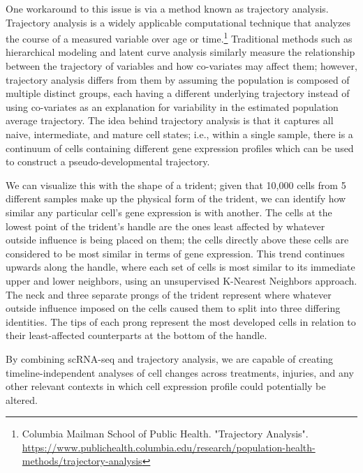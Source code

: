 \documentclass{article}
\begin{document}
One workaround to this issue is via a method known as trajectory analysis. Trajectory analysis is a widely applicable computational technique that analyzes the course of a measured variable over age or time.\footnote{Columbia Mailman School of Public Health. "Trajectory Analysis". \url{https://www.publichealth.columbia.edu/research/population-health-methods/trajectory-analysis}} Traditional methods such as hierarchical modeling and latent curve analysis similarly measure the relationship between the trajectory of variables and how co-variates may affect them; however, trajectory analysis differs from them by assuming the population is composed of multiple distinct groups, each having a different underlying trajectory instead of using co-variates as an explanation for variability in the estimated population average trajectory. The idea behind trajectory analysis is that it captures all naive, intermediate, and mature cell states; i.e., within a single sample, there is a continuum of cells containing different gene expression profiles which can be used to construct a pseudo-developmental trajectory.

We can visualize this with the shape of a trident; given that 10,000 cells from 5 different samples make up the physical form of the trident, we can identify how similar any particular cell's gene expression is with another. The cells at the lowest point of the trident's handle are the ones least affected by whatever outside influence is being placed on them; the cells directly above these cells are considered to be most similar in terms of gene expression. This trend continues upwards along the handle, where each set of cells is most similar to its immediate upper and lower neighbors, using an unsupervised K-Nearest Neighbors approach. The neck and three separate prongs of the trident represent where whatever outside influence imposed on the cells caused them to split into three differing identities. The tips of each prong represent the most developed cells in relation to their least-affected counterparts at the bottom of the handle.

By combining scRNA-seq and trajectory analysis, we are capable of creating timeline-independent analyses of cell changes across treatments, injuries, and any other relevant contexts in which cell expression profile could potentially be altered.
\end{document}
